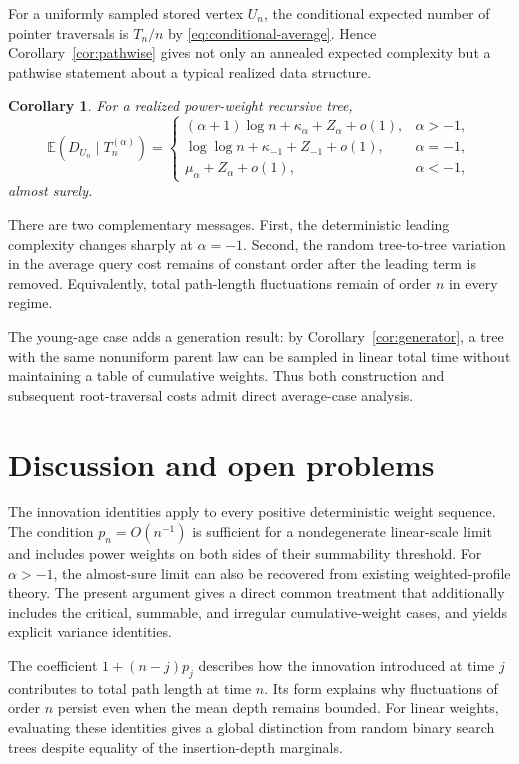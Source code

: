 \documentclass[11pt,a4paper]{article}
\newtheorem{corollary}[theorem]{Corollary}
\newcommand{\E}{\mathbb{E}}
\newcommand{\1}{\mathbf{1}}
\begin{document}
For a uniformly sampled stored vertex $U_n$, the conditional expected
number of pointer traversals is $T_n/n$ by \eqref{eq:conditional-average}.  Hence
Corollary~\ref{cor:pathwise} gives not only an annealed expected complexity
but a pathwise statement about a typical realized data structure.

\begin{corollary}\label{cor:query}
For a realized power-weight recursive tree,
\[
\E(D_{U_n}\mid T_n^{(\alpha)})
=
\begin{cases}
(\alpha+1)\log n+\kappa_\alpha+Z_\alpha+o(1),
&\alpha>-1,\\[1mm]
\log\log n+\kappa_{-1}+Z_{-1}+o(1),
&\alpha=-1,\\[1mm]
\mu_\alpha+Z_\alpha+o(1),
&\alpha<-1,
\end{cases}
\]
almost surely.
\end{corollary}

There are two complementary messages.  First, the deterministic leading
complexity changes sharply at $\alpha=-1$.  Second, the random tree-to-tree
variation in the average query cost remains of constant order after the
leading term is removed.  Equivalently, total path-length fluctuations remain
of order $n$ in every regime.

The young-age case adds a generation result: by
Corollary~\ref{cor:generator}, a tree with the same nonuniform parent law can
be sampled in linear total time without maintaining a table of cumulative
weights.  Thus both construction and subsequent root-traversal costs admit
direct average-case analysis.

\section{Discussion and open problems}\label{sec:discussion}
The innovation identities apply to every positive deterministic weight sequence.
The condition $p_n=O(n^{-1})$ is sufficient for a nondegenerate linear-scale limit and includes power weights on both sides of their summability threshold.
For $\alpha>-1$, the almost-sure limit can also be recovered from existing weighted-profile theory.
The present argument gives a direct common treatment that additionally includes the critical, summable, and irregular cumulative-weight cases, and yields explicit variance identities.

The coefficient $1+(n-j)p_j$ describes how the innovation introduced at time $j$ contributes to total path length at time $n$.
Its form explains why fluctuations of order $n$ persist even when the mean depth remains bounded.
For linear weights, evaluating these identities gives a global distinction from random binary search trees despite equality of the insertion-depth marginals.
\end{document}
